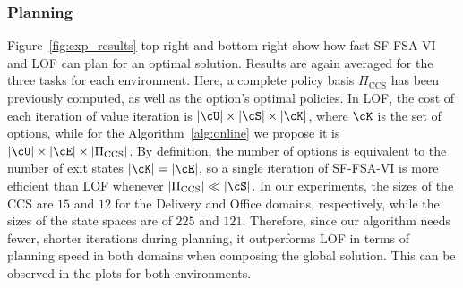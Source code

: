 \subsubsection{Planning} Figure~\ref{fig:exp_results} top-right and bottom-right show how fast SF-FSA-VI and LOF can plan for an optimal solution. Results are again averaged for the three tasks for each environment. Here, a complete policy basis $\Pi_\text{CCS}$ has been previously computed, as well as the option's optimal policies.  In LOF, the cost of each iteration of value iteration is $\lvert\cU\rvert\times\lvert\cS\rvert\times \lvert\cK\rvert$, where $\cK$ is the set of options, while for the Algorithm~\ref{alg:online} we propose it is $\lvert\cU\rvert\times\lvert\cE\rvert\times\lvert\Pi_\text{CCS}\rvert$. By definition, the number of options is equivalent to the number of exit states $\lvert\cK\rvert=\lvert\cE\rvert$, so a single iteration of SF-FSA-VI is more efficient than LOF whenever $\lvert\Pi_\text{CCS}\rvert \ll \lvert\cS\rvert$. In our experiments, the sizes of the CCS are $15$ and $12$ for the Delivery and Office domains, respectively, while the sizes of the state spaces are of $225$ and $121$. Therefore, since our algorithm needs fewer, shorter iterations during planning, it outperforms LOF in terms of planning speed in both domains when composing the global solution. This can be observed in the plots for both environments. 

